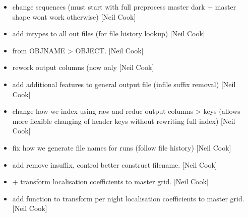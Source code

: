 \documentclass[a4paper,10pt,english]{report}
\begin{document}
\begin{itemize}
\item {} 
 \sphinxhyphen{} change sequences (must
start with full preprocess \sphinxhyphen{} master dark + master shape wont work
otherwise) {[}Neil Cook{]}

\item {} 
 \sphinxhyphen{} add intypes to all out
files (for file history lookup) {[}Neil Cook{]}

\item {} 
 \sphinxhyphen{}  from OBJNAME
\textendash{}\textgreater{} OBJECT. {[}Neil Cook{]}

\item {} 
 \sphinxhyphen{} re\sphinxhyphen{}work output columns (now
only  {[}Neil Cook{]}

\item {} 
 \sphinxhyphen{} add additional features to general
output file (infile suffix removal) {[}Neil Cook{]}

\item {} 
 \sphinxhyphen{} change how we index using raw and reduc
output columns \textendash{}\textgreater{} keys (allows more flexible changing of header keys
without rewriting full index) {[}Neil Cook{]}

\item {} 
 \sphinxhyphen{} fix how we generate file names for runs
(follow file history) {[}Neil Cook{]}

\item {} 
 \sphinxhyphen{} add remove insuffix, control better construct
filename. {[}Neil Cook{]}

\item {} 
 +  \sphinxhyphen{} transform
localisation coefficients to master grid. {[}Neil Cook{]}

\item {} 
 \sphinxhyphen{} add  function to transform
per night localisation coefficients to master grid. {[}Neil Cook{]}


\end{itemize}
\end{document}
